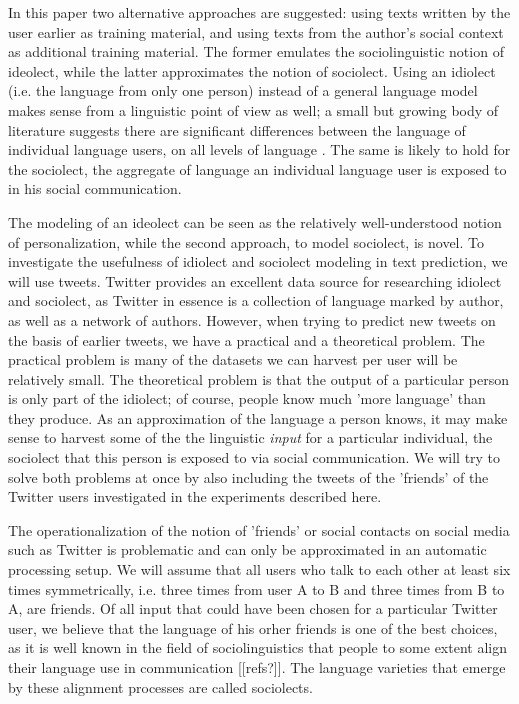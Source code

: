 \documentclass[11pt]{article}
\begin{document}
In this paper two alternative approaches are suggested: using texts written by the user earlier as training material, and using texts from the author's social context as additional training material. The former emulates the sociolinguistic notion of ideolect, while the latter approximates the notion of sociolect. Using an idiolect (i.e. the language from only one person) instead of a general language model makes sense from a linguistic point of view as well; a small but growing body of literature suggests there are significant differences between the language of individual language users, on all levels of language \cite[among others]{mollin09,barlow10}. The same is likely to hold for the sociolect, the aggregate of language an individual language user is exposed to in his social communication.

The modeling of an ideolect can be seen as the relatively well-understood notion of personalization, while the second approach, to model sociolect, is novel. To investigate the usefulness of idiolect and sociolect modeling in text prediction, we will use tweets. Twitter provides an excellent data source for researching idiolect and sociolect, as Twitter in essence is a collection of language marked by author, as well as a network of authors. However, when trying to predict new tweets on the basis of earlier tweets, we have a practical and a theoretical problem. The practical problem is many of the datasets we can harvest per user will be relatively small. The theoretical problem is that the output of a particular person is only part of the idiolect; of course, people know much 'more language' than they produce. As an approximation of the language a person knows, it may make sense to harvest some of the the linguistic \emph{input} for a particular individual, the sociolect that this person is exposed to via social communication. We will try to solve both problems at once by also including the tweets of the 'friends' of the Twitter users investigated in the experiments described here. 

The operationalization of the notion of 'friends' or social contacts on social media such as Twitter is problematic and can only be approximated in an automatic processing setup. We will assume that all users who talk to each other at least six times symmetrically, i.e. three times from user A to B and three times from B to A, are friends. Of all input that could have been chosen for a particular Twitter user, we believe that the language of his orher friends is one of the best choices, as it is well known in the field of sociolinguistics that people to some extent align their language use in communication [[refs?]]. The language varieties that emerge by these alignment processes are called sociolects.
\end{document}
